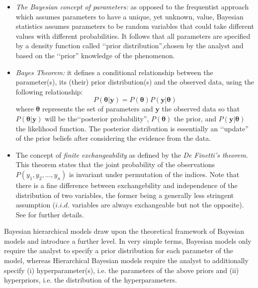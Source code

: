 \begin{itemize}
    \item \textit{The Bayesian concept of parameters:} as opposed to the frequentist approach which assumes parameters to have a unique, yet unknown, value,  Bayesian statistics assumes parameters to be random variables that could take different values with different probabilities. It follows that all parameters are specified by a density function called \lq\lq prior distribution'',chosen by the analyst and based on the \lq\lq prior'' knowledge of the phenomenon. 
    \item \textit{Bayes Theorem:} it defines a conditional relationship between the parameter(s), its (their) prior distribution(s) and the observed data, using the following relationship:
    \begin{equation}
        P(\bm{\theta|\bm{y}}) = P(\bm{\theta})P(\bm{y}|\bm{\theta})
    \end{equation}
where $\bm{\theta}$ represents the set of parameters and $\bm{y}$ the observed data so that $P(\bm{\theta|\bm{y}})$ will be the\lq\lq posterior probability'', $P(\bm{\theta})$ the prior, and $P(\bm{y}|\bm{\theta})$ the likelihood function. The posterior distribution is essentially an \lq\lq update'' of the prior beliefs after considering the evidence from the data.


    \item The concept of \textit{finite exchangeability} as defined by the \textit{De Finetti's theorem}. This theorem states that the joint probability of the observations\\
    $P(y_1,y_2,...,y_n)$ is invariant under permutation of the indices. Note that there is a fine difference between exchangebility and independence of the distribution of two variables, the former being a generally less stringent assumption ($i.i.d.$ variables are always exchangeable but not the opposite). See \cite{Regazzini1987} for further details.
\end{itemize}

 Bayesian hierarchical models draw upon the theoretical framework of Bayesian models and introduce a further level. In very simple terms, Bayesian models only require the analyst to specify a prior distribution for each parameter of the model, whereas Hierarchical Bayesian models require the analyst to additionally specify (i)  hyperparameter(s), i.e. the parameters of the above priors and (ii) hyperpriors, i.e. the distribution of the hyperparameters.\\




